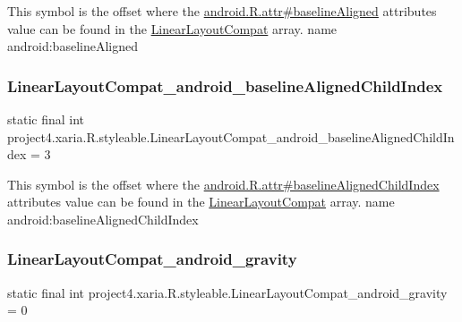 This symbol is the offset where the \hyperlink{}{android.\+R.\+attr\#baseline\+Aligned} attribute\textquotesingle{}s value can be found in the \hyperlink{classproject4_1_1xaria_1_1R_1_1styleable_a7f929bdf7d740d51fa83ce463e56c432}{Linear\+Layout\+Compat} array.  name android\+:baseline\+Aligned \mbox{\label{classproject4_1_1xaria_1_1R_1_1styleable_ab84764f190efeef60cefb6eba9332ba5}} 
\subsubsection{\texorpdfstring{Linear\+Layout\+Compat\+\_\+android\+\_\+baseline\+Aligned\+Child\+Index}{LinearLayoutCompat\_android\_baselineAlignedChildIndex}}
{\footnotesize\ttfamily static final int project4.\+xaria.\+R.\+styleable.\+Linear\+Layout\+Compat\+\_\+android\+\_\+baseline\+Aligned\+Child\+Index = 3\hspace{0.3cm}{\ttfamily [static]}}

This symbol is the offset where the \hyperlink{}{android.\+R.\+attr\#baseline\+Aligned\+Child\+Index} attribute\textquotesingle{}s value can be found in the \hyperlink{classproject4_1_1xaria_1_1R_1_1styleable_a7f929bdf7d740d51fa83ce463e56c432}{Linear\+Layout\+Compat} array.  name android\+:baseline\+Aligned\+Child\+Index \mbox{\label{classproject4_1_1xaria_1_1R_1_1styleable_a2a3b513c0f7f71ed6b75218dd32d011e}} 
\subsubsection{\texorpdfstring{Linear\+Layout\+Compat\+\_\+android\+\_\+gravity}{LinearLayoutCompat\_android\_gravity}}
{\footnotesize\ttfamily static final int project4.\+xaria.\+R.\+styleable.\+Linear\+Layout\+Compat\+\_\+android\+\_\+gravity = 0\hspace{0.3cm}{\ttfamily [static]}}

